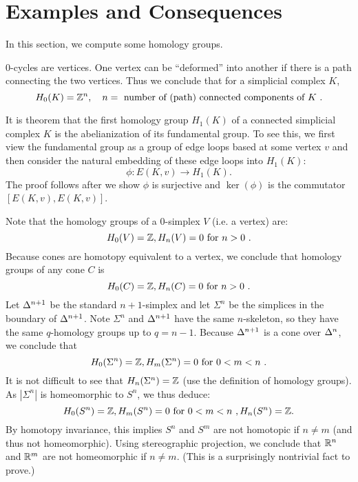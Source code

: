 \section{Examples and Consequences}
In this section, we compute some homology groups.

$0$-cycles are vertices. One vertex can be ``deformed'' into another if there is a path connecting the two vertices. Thus we conclude that for a simplicial complex $K$,
\[
    H_0(K) = {\mathbb Z}^n, \quad n = \text{ number of (path) connected components of $K$ }.
\]

It is theorem that the first homology group $H_1(K)$ of a connected simplicial complex $K$ is the abelianization of its fundamental group. To see this, we first view the fundamental group as a group of edge loops based at some vertex $v$ and then consider the natural embedding of these edge loops into $H_1(K)$:
\[
    \phi: E(K,v) \to H_1(K).
\]
The proof follows after we show $\phi$ is surjective and $\ker(\phi)$ is the commutator $[E(K,v), E(K,v)]$.

Note that the homology groups of a 0-simplex $V$ (i.e. a vertex) are:
\[
    H_0(V) = {\mathbb Z}, H_n(V) = 0 \text{ for $n > 0$ }.
\]
Because cones are homotopy equivalent to a vertex, we conclude that homology groups of any cone $C$ is
\[
    H_0(C) = {\mathbb Z}, H_n(C) = 0 \text{ for $n > 0$ }.
\]
Let $\Delta^{n+1}$ be the standard $n+1$-simplex and let $\Sigma^n$ be the simplices in the boundary of $\Delta^{n+1}$. Note $\Sigma^n$ and $\Delta^{n+1}$ have the same $n$-skeleton, so they have the same $q$-homology groups up to $q = n - 1$. Because $\Delta^{n+1}$ is a cone over $\Delta^n$, we conclude that
\[
    H_0(\Sigma^n) = {\mathbb Z}, H_m(\Sigma^n) = 0 \text{ for $0 < m < n$ }.
\]
It is not difficult to see that $H_n(\Sigma^n) = {\mathbb Z}$ (use the definition of homology groups). As $|\Sigma^n|$ is homeomorphic to $S^n$, we thus deduce:
\[
    H_0(S^n) = {\mathbb Z}, H_m(S^n) = 0 \text{ for $0 < m < n$ }, H_n(S^n) = {\mathbb Z}.
\]
By homotopy invariance, this implies $S^n$ and $S^m$ are not homotopic if $n \neq m$ (and thus not homeomorphic). Using stereographic projection, we conclude that ${\mathbb R}^n$ and ${\mathbb R}^m$ are not homeomorphic if $n \neq m$. (This is a surprisingly nontrivial fact to prove.)